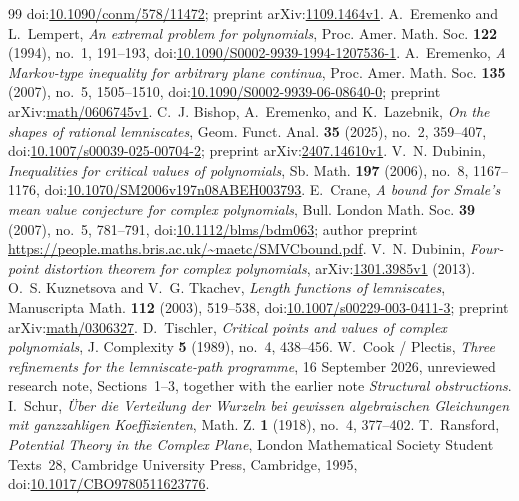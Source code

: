 \begin{thebibliography}{99}
  doi:\href{https://doi.org/10.1090/conm/578/11472}{10.1090/conm/578/11472};
  preprint arXiv:\href{https://arxiv.org/abs/1109.1464v1}{1109.1464v1}.
 A.~Eremenko and L.~Lempert,
  \emph{An extremal problem for polynomials}, Proc. Amer. Math. Soc.
  \textbf{122} (1994), no.~1, 191--193,
  doi:\href{https://doi.org/10.1090/S0002-9939-1994-1207536-1}
  {10.1090/S0002-9939-1994-1207536-1}.
 A.~Eremenko,
  \emph{A Markov-type inequality for arbitrary plane continua},
  Proc. Amer. Math. Soc. \textbf{135} (2007), no.~5, 1505--1510,
  doi:\href{https://doi.org/10.1090/S0002-9939-06-08640-0}
  {10.1090/S0002-9939-06-08640-0};
  preprint arXiv:\href{https://arxiv.org/abs/math/0606745v1}{math/0606745v1}.
 C.~J. Bishop, A.~Eremenko, and
  K.~Lazebnik, \emph{On the shapes of rational lemniscates}, Geom. Funct.
  Anal. \textbf{35} (2025), no.~2, 359--407,
  doi:\href{https://doi.org/10.1007/s00039-025-00704-2}
  {10.1007/s00039-025-00704-2};
  preprint arXiv:\href{https://arxiv.org/abs/2407.14610v1}{2407.14610v1}.
 V.~N. Dubinin,
  \emph{Inequalities for critical values of polynomials}, Sb. Math.
  \textbf{197} (2006), no.~8, 1167--1176,
  doi:\href{https://doi.org/10.1070/SM2006v197n08ABEH003793}{10.1070/SM2006v197n08ABEH003793}.
 E.~Crane,
  \emph{A bound for Smale's mean value conjecture for complex polynomials},
  Bull. London Math. Soc. \textbf{39} (2007), no.~5, 781--791,
  doi:\href{https://doi.org/10.1112/blms/bdm063}{10.1112/blms/bdm063};
  author preprint \url{https://people.maths.bris.ac.uk/~maetc/SMVCbound.pdf}.
 V.~N. Dubinin,
  \emph{Four-point distortion theorem for complex polynomials},
  arXiv:\href{https://arxiv.org/abs/1301.3985v1}{1301.3985v1} (2013).
 O.~S. Kuznetsova and V.~G. Tkachev,
  \emph{Length functions of lemniscates}, Manuscripta Math.
  \textbf{112} (2003), 519--538,
  doi:\href{https://doi.org/10.1007/s00229-003-0411-3}{10.1007/s00229-003-0411-3};
  preprint arXiv:\href{https://arxiv.org/abs/math/0306327}{math/0306327}.
 D.~Tischler,
  \emph{Critical points and values of complex polynomials},
  J. Complexity \textbf{5} (1989), no.~4, 438--456.
 W.~Cook / Plectis,
  \emph{Three refinements for the lemniscate-path programme}, 16 September 2026,
  unreviewed research note, Sections~1--3, together with the earlier
  note \emph{Structural obstructions}.
 I.~Schur,
  \emph{\"Uber die Verteilung der Wurzeln bei gewissen algebraischen
  Gleichungen mit ganzzahligen Koeffizienten}, Math. Z. \textbf{1}
  (1918), no.~4, 377--402.
 T.~Ransford,
  \emph{Potential Theory in the Complex Plane}, London Mathematical Society
  Student Texts~28, Cambridge University Press, Cambridge, 1995,
  doi:\href{https://doi.org/10.1017/CBO9780511623776}{10.1017/CBO9780511623776}.
\end{thebibliography}
